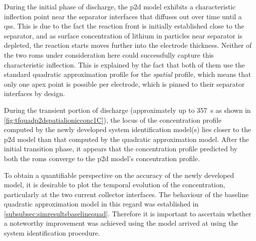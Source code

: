 During  the  initial  phase  of   discharge,  the  \gls{p2d}  model  exhibits  a
characteristic inflection point near the  separator interfaces that diffuses out
over time  until a  \gls{qss}. This  is due to  the fact  the reaction  front is
initially established  close to the  separator, and as surface  concentration of
lithium  in particles  near separator  is  depleted, the  reaction starts  moves
further  into the  electrode thickness.  Neither  of the  two \glspl{rom}  under
consideration here  could successfully  capture this  characteristic inflection.
This is  explained by  the fact  that both  of them  use the  standard quadratic
approximation profile for the \emph{spatial}  profile, which means that only one
apex  point is  possible  per  electrode, which  is  pinned  to their  separator
interfaces by design.

During the transient portion of discharge (approximately up to \SI{357}{\second}
as   shown   in \cref{fig:tfquadp2dspatialionicconc1C}),   the  locus   of   the
concentration  profile computed  by  the newly  developed system  identification
model(s) lies closer to the \gls{p2d} model  than that computed by the 
quadratic  approximation model.  After  the  initial transition  phase,  it
appears  that  the  concentration  profile predicted  by  both  the  \glspl{rom}
converge to the \gls{p2d} model's concentration profile.


To obtain  a quantifiable  perspective on  the accuracy  of the  newly developed
model, it  is desirable  to plot  the temporal  evolution of  the concentration,
particularly  at  the  two  current   collector  interfaces.  The  behaviour  of
the  baseline  quadratic approximation  model  in  this regard  was  established
in \cref{subsubsec:simresultsbaselinequad}.   Therefore  it   is  important   to
ascertain whether a noteworthy improvement  was achieved using the model arrived
at using the system identification procedure.

